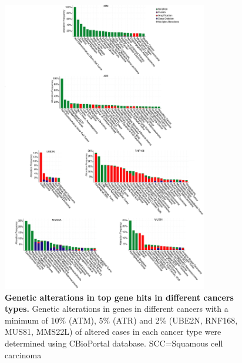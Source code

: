 \begin{figure}
    \centering
    \includegraphics[width=0.8\textwidth]{supplement/figures/cbioportal}
    \caption[Cancer-associated genetic alterations in top gene hits]
            {\small{\textbf{Genetic alterations in top gene hits in different cancers types.}}
            \textbf{} Genetic alterations in genes in different cancers with a minimum of 10\% (ATM), 5\% (ATR) and 2\% (UBE2N, RNF168, MUS81, MMS22L) of altered cases in each cancer type were determined using CBioPortal database. SCC=Squamous cell carcinoma 
            }
        \label{sfig:cbioportal}
\end{figure}


